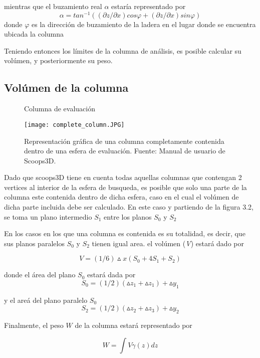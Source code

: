 mientras que el buzamiento real $ \alpha$ estar\'ia representado por \\
$$ \alpha = tan^{-1} ((\partial z/ \partial x)\textit{cos}\varphi +(\partial z/ \partial x)\textit{sin}\varphi )  $$
donde $\varphi$ es la direcci\'on de buzamiento de la ladera en el lugar donde se encuentra ubicada la columna

Teniendo entonces los l\'imites de la columna de an\'alisis, es posible calcular su vol\'umen, y posteriormente su peso.\cite{formulas}

\subsection{Vol\'umen de la columna}



\begin{figure}[h]
\caption{Columna de evaluaci\'on}
\centering
\texttt{[image: complete\_column.JPG]}
\caption{Representaci\'on gr\'afica de una columna completamente contenida dentro de una esfera de evaluaci\'on. Fuente: Manual de usuario de Scoops3D. \cite{columngraph}  }
\label{fig:failure-plane}
\end{figure}

Dado que scoops3D tiene en cuenta todas aquellas columnas que contengan 2 vertices al interior de la esfera de busqueda, es posible que solo una parte de la columna este contenida dentro de dicha esfera, caso en el cual el vol\'umen de dicha parte incluida debe ser calculado.
En este caso y partiendo de la figura 3.2, se toma un plano intermedio $ S_{1} $ entre los planos $ S_{0} $ y $ S_{2} $

En los casos en los que una columna es contenida es su totalidad, es decir, que sus planos paralelos $S_{0}$ y $S_{2}$ tienen igual area. el vol\'umen (\textit{V}) estar\'a dado por

$$\textit{V}= (1/6)\vartriangle \textit{x}(S_{0} + 4S_{1} + S_{2})$$

donde el \'area del plano $\textit{S}_{0}$ estar\'a dada por
$$ \textit{S}_{0} = (1/2)(\vartriangle z_{1} +\vartriangle z_{1})+\vartriangle \textit{y}_{1}  $$

y el are\'a del plano paralelo $\textit{S}_{0}$
$$ \textit{S}_{2} = (1/2)(\vartriangle z_{2} +\vartriangle z_{3})+\vartriangle \textit{y}_{2}  $$

Finalmente, el peso $W$ de la columna estar\'a representado por

$$\textit{W} = \int \textit{V} \gamma (\textit{z}) \textit{dz} $$

